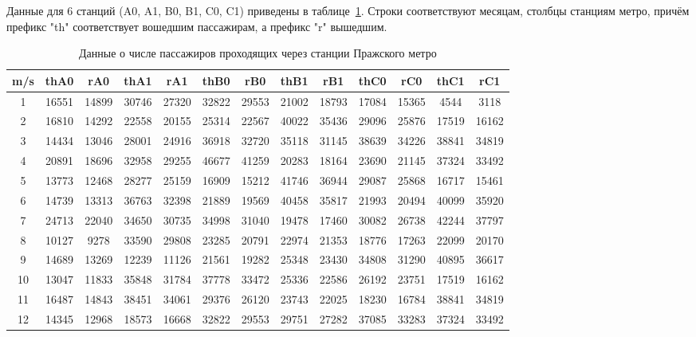 \documentclass[12pt,a4paper,oneside]{extarticle}
\begin{document}
    Данные для 6 станций (A0, A1, B0, B1, C0, C1) приведены в таблице~\ref{tabular:data}. Строки соответствуют месяцам, столбцы станциям метро, причём префикс "th" \space соответствует вошедшим пассажирам, а префикс "r" \space вышедшим.
    \begin{table}[ht!]
        \caption{Данные о числе пассажиров проходящих через станции Пражского метро}
        \centering
        \label{tabular:data}
        \small
        \begin{tabular}{|c|c|c|c|c|c|c|c|c|c|c|c|c|}
        \hline
        m/s & thA0 & rA0 & thA1 & rA1 & thB0 & rB0 & thB1 & rB1 & thC0 & rC0 & thC1 & rC1 \\ \hline
        1 & 16551 & 14899 & 30746 & 27320 & 32822 & 29553 & 21002 & 18793 & 17084 & 15365 & 4544 & 3118 \\ \hline
        2 & 16810 & 14292 & 22558 & 20155 & 25314 & 22567 & 40022 & 35436 & 29096 & 25876 & 17519 & 16162 \\ \hline
        3 & 14434 & 13046 & 28001 & 24916 & 36918 & 32720 & 35118 & 31145 & 38639 & 34226 & 38841 & 34819 \\ \hline
        4 & 20891 & 18696 & 32958 & 29255 & 46677 & 41259 & 20283 & 18164 & 23690 & 21145 & 37324 & 33492 \\ \hline
        5 & 13773 & 12468 & 28277 & 25159 & 16909 & 15212 & 41746 & 36944 & 29087 & 25868 & 16717 & 15461 \\ \hline
        6 & 14739 & 13313 & 36763 & 32398 & 21889 & 19569 & 40458 & 35817 & 21993 & 20494 & 40099 & 35920 \\ \hline
        7 & 24713 & 22040 & 34650 & 30735 & 34998 & 31040 & 19478 & 17460 & 30082 & 26738 & 42244 & 37797 \\ \hline
        8 & 10127 & 9278 & 33590 & 29808 & 23285 & 20791 & 22974 & 21353 & 18776 & 17263 & 22099 & 20170 \\ \hline
        9 & 14689 & 13269 & 12239 & 11126 & 21561 & 19282 & 25348 & 23430 & 34808 & 31290 & 40895 & 36617 \\ \hline
        10 & 13047 & 11833 & 35848 & 31784 & 37778 & 33472 & 25336 & 22586 & 26192 & 23751 & 17519 & 16162 \\ \hline
        11 & 16487 & 14843 & 38451 & 34061 & 29376 & 26120 & 23743 & 22025 & 18230 & 16784 & 38841 & 34819 \\ \hline
        12 & 14345 & 12968 & 18573 & 16668 & 32822 & 29553 & 29751 & 27282 & 37085 & 33283 & 37324 & 33492 \\ \hline
        \end{tabular}
    \end{table}
\end{document}
